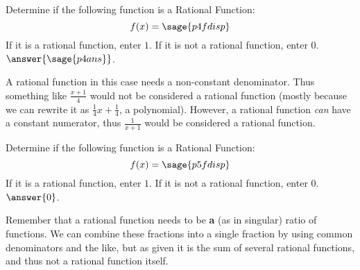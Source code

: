 \documentclass{ximera}
\begin{document}
\begin{problem}
    Determine if the following function is a Rational Function:
    \[
        f(x) = \sage{p4fdisp}
    \]
    If it is a rational function, enter $1$. If it is not a rational function, enter $0$. $\answer{\sage{p4ans}}$.
    
    \begin{feedback}
        A rational function in this case needs a non-constant denominator. Thus something like $\frac{x+1}{4}$ would not be considered a rational function (mostly because we can rewrite it as $\frac{1}{4}x + \frac{1}{4}$, a polynomial). However, a rational function \textit{can} have a constant numerator, thus $\frac{1}{x+1}$ would be considered a rational function.
    \end{feedback}
\end{problem}


\begin{problem}
    Determine if the following function is a Rational Function:
    \[
        f(x) = \sage{p5fdisp}
    \]
    If it is a rational function, enter $1$. If it is not a rational function, enter $0$. $\answer{0}$.
    \begin{feedback}
        Remember that a rational function needs to be \textbf{a} (as in singular) ratio of functions. We can combine these fractions into a single fraction by using common denominators and the like, but as given it is the sum of several rational functions, and thus not a rational function itself.
    \end{feedback}
    
\end{problem}
\end{document}
